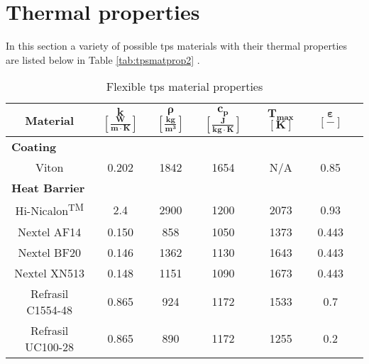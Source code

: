 \section{Thermal properties} \label{sec:Thermoprop}
In this section a variety of possible \gls{tps} materials with their thermal properties are listed below in Table \ref{tab:tpsmatprop2} \cite{Corso2009,Corso2011,DuPont2011,Smith2011,Nye,Zinkle1998}.

\begin{table}[ht]
	\caption {Flexible \acrlong{tps} material properties}
	\centering
	\begin{tabular}{|c|c|c|c|c|c|c|}
		\hline
		\textbf{Material}         & \textbf{ $\mathbf{k}$ $\mathbf{\left[\frac{W}{m\cdot K}\right]} $} & \textbf{ $\mathbf{ \rho }$ $\mathbf{ \left[ \frac{kg}{m^3} \right] }$} & \textbf{  $\mathbf{ c_{p} }$ $\mathbf{ \left[ \frac{J}{kg \cdot K} \right] }$ }& \textbf{ $\mathbf{ T_{max} }$ $\mathbf{ [ K ] }$} &\textbf{ $\mathbf{ \varepsilon }$ $\mathbf{ [ - ] }$} \\[1.6ex]   \hline \hline
		\multicolumn{6}{|l|}{\textbf{Coating}}			\\ \hline
		Viton       & 0.202 & 1842 & 1654 & N/A	 & 0.85 \\ \hline
		\multicolumn{6}{|l|}{\textbf{Heat Barrier}}			\\ \hline
		Hi-Nicalon\textsuperscript{TM}      & 2.4       & 2900   & 1200   & 2073      & 0.93        \\ \hline
		Nextel AF14       & 0.150                                                 & 858                                        & 1050                                            & 1373	 & 0.443 \\ \hline
		Nextel BF20       & 0.146	& 1362                                        & 1130 & 1643	 & 0.443 \\ \hline
		Nextel XN513      & 0.148                                                 & 1151                                       & 1090                                            & 1673	 & 0.443 \\ \hline
		Refrasil C1554-48 & 0.865                                                 & 924                                        & 1172                                            & 1533	 & 0.7 \\ \hline
		Refrasil UC100-28 & 0.865                                                 & 890                                        & 1172                                            & 1255  & 0.2 \\ \hline

\end{tabular}
\end{table}

